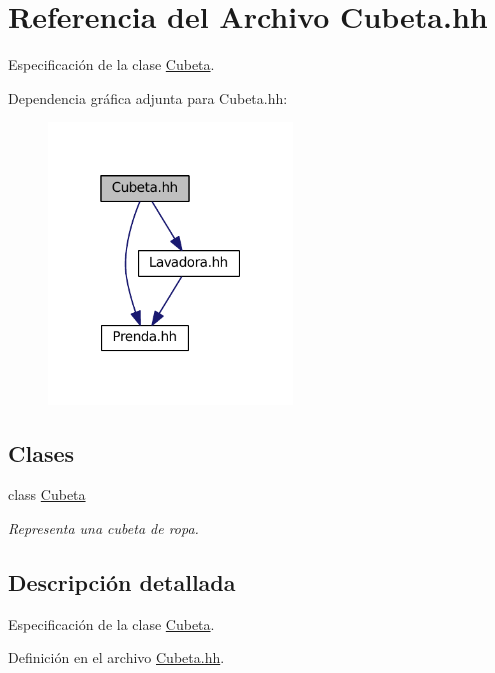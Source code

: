 \hypertarget{_cubeta_8hh}{\section{Referencia del Archivo Cubeta.\-hh}
\label{_cubeta_8hh}
}


Especificación de la clase \hyperlink{class_cubeta}{Cubeta}.  


Dependencia gráfica adjunta para Cubeta.\-hh\-:\nopagebreak
\begin{figure}[H]
\begin{center}
\leavevmode
\includegraphics[width=184pt]{_cubeta_8hh__incl}
\end{center}
\end{figure}
\subsection*{Clases}
\begin{DoxyCompactItemize}
\item 
class \hyperlink{class_cubeta}{Cubeta}
\begin{DoxyCompactList}\small\item\em Representa una cubeta de ropa. \end{DoxyCompactList}\end{DoxyCompactItemize}


\subsection{Descripción detallada}
Especificación de la clase \hyperlink{class_cubeta}{Cubeta}. 

Definición en el archivo \hyperlink{_cubeta_8hh_source}{Cubeta.\-hh}.

